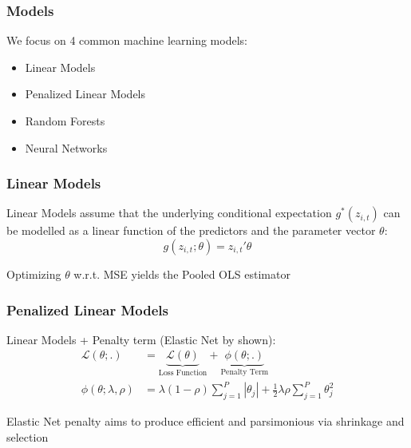 \documentclass[aspectratio=169]{beamer}
\begin{document}

\begin{frame}
\frametitle{Models}
We focus on 4 common machine learning models:
\begin{itemize}
	\item Linear Models
	\item Penalized Linear Models
	\item Random Forests
	\item Neural Networks
\end{itemize}
\end{frame}

\begin{frame}
\frametitle{Linear Models}
Linear Models assume that the underlying conditional expectation \( g^*(z_{i, t}) \) can be modelled as a linear function of the predictors and the parameter vector \( \theta \):
	\begin{equation}
	g(z_{i, t};\theta) = z_{i, t}' \theta
	\end{equation}
	
Optimizing $\theta$ w.r.t. MSE yields the Pooled OLS estimator
\end{frame}


\begin{frame}
\frametitle{Penalized Linear Models}
Linear Models + Penalty term (Elastic Net by \cite{zou_regularization_2005} shown):
	\begin{align}
	\mathcal{L(\theta;.)} &= 
		\underset{\text{Loss Function}}{\underbrace{\mathcal{L(\theta)}}} + 
		\underset{\text{Penalty Term}}{\underbrace{\phi(\theta;.)}} \\
	\phi(\theta;\lambda,\rho) &= 
		\lambda(1-\rho) \sum_{j = 1}^{P}|\theta_j| +
		\frac{1}{2} \lambda \rho \sum_{j = 1}^{P}\theta_j^2
	\end{align}

Elastic Net penalty aims to produce efficient and parsimonious via shrinkage and selection
	
\end{frame}

\end{document}
